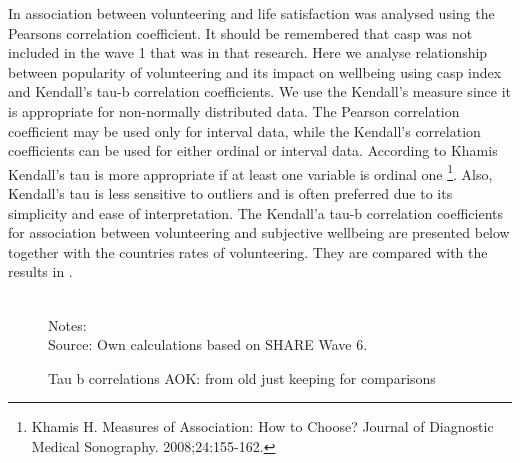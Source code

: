 \documentclass[10pt, letterpaper]{article}
\begin{document}
\begin{spacing}{1.4}
In \citet{haski09} association between volunteering and life satisfaction was analysed using the Pearsons correlation coefficient. It should be remembered that casp was not included in the wave 1 that was in that research. Here we analyse relationship between popularity of volunteering and its impact on wellbeing using casp index and Kendall's tau-b correlation coefficients. We use the Kendall's measure since it is appropriate for non-normally distributed data. The Pearson correlation coefficient may be used only for interval data, while the Kendall's correlation coefficients can be used for either ordinal or interval data. According to Khamis  Kendall's tau is more appropriate if at least one variable is ordinal one \footnote{Khamis H. Measures of Association: How to Choose? Journal of Diagnostic Medical Sonography. 2008;24:155-162.}. Also, Kendall's tau is less sensitive to outliers and is often preferred due to its simplicity and ease of interpretation. The Kendall'a tau-b correlation coefficients for association between volunteering and subjective wellbeing  are presented below together with the countries rates of volunteering. They are compared with the results in \citet{haski09}. 


\begin{figure}[H]
\centering
\caption{Tau b correlations AOK: from old just keeping for comparisons} 
\label{fig:taub}
\begin{minipage}{1\linewidth}
\quad
{}~\\
{\footnotesize Notes: }~\\
{\footnotesize Source: Own calculations based on SHARE Wave 6.}
\end{minipage}
\end{figure} 


\end{spacing}
\end{document}
